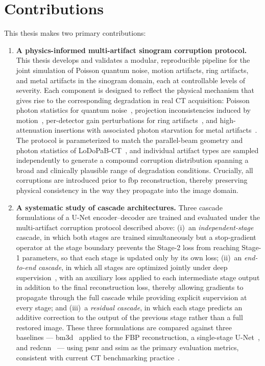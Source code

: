 \section{Contributions}
\label{sec:intro_contributions}

This thesis makes two primary contributions:

\begin{enumerate}
    \item \textbf{A physics-informed multi-artifact sinogram corruption protocol.} This thesis develops and validates a modular, reproducible pipeline for the joint simulation of Poisson quantum noise, motion artifacts, ring artifacts, and metal artifacts in the sinogram domain, each at controllable levels of severity. Each component is designed to reflect the physical mechanism that gives rise to the corresponding degradation in real CT acquisition: Poisson photon statistics for quantum noise~\cite{Leuschner2021}, projection inconsistencies induced by motion~\cite{LuMackie2002, Lu2005}, per-detector gain perturbations for ring artifacts~\cite{Sijbers2004, Prell2009}, and high-attenuation insertions with associated photon starvation for metal artifacts~\cite{ZhangYu2018, Gjesteby2016}. The protocol is parameterized to match the parallel-beam geometry and photon statistics of LoDoPaB-CT~\cite{Leuschner2021}, and individual artifact types are sampled independently to generate a compound corruption distribution spanning a broad and clinically plausible range of degradation conditions. Crucially, all corruptions are introduced prior to \gls{fbp} reconstruction, thereby preserving physical consistency in the way they propagate into the image domain.

    \item \textbf{A systematic study of cascade architectures.} Three cascade formulations of a U-Net encoder--decoder are trained and evaluated under the multi-artifact corruption protocol described above: (i)~an \emph{independent-stage} cascade, in which both stages are trained simultaneously but a stop-gradient operator at the stage boundary prevents the Stage-2 loss from reaching Stage-1 parameters, so that each stage is updated only by its own loss; (ii)~an \emph{end-to-end cascade}, in which all stages are optimized jointly under deep supervision~\cite{Lee2015DSN}, with an auxiliary loss applied to each intermediate stage output in addition to the final reconstruction loss, thereby allowing gradients to propagate through the full cascade while providing explicit supervision at every stage; and (iii)~a \emph{residual cascade}, in which each stage predicts an additive correction to the output of the previous stage rather than a full restored image. These three formulations are compared against three baselines --- \gls{bm3d}~\cite{Dabov2007} applied to the FBP reconstruction, a single-stage U-Net~\cite{Ronneberger2015}, and \gls{redcnn}~\cite{Chen2017} --- using \gls{psnr} and \gls{ssim} as the primary evaluation metrics, consistent with current CT benchmarking practice~\cite{Kiss2024}.
\end{enumerate}

